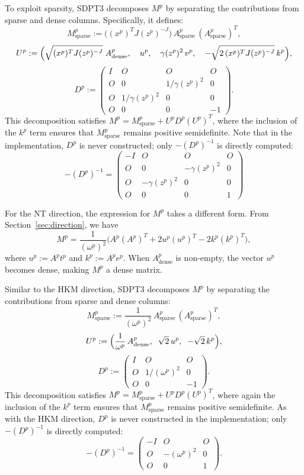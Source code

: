 To exploit sparsity, SDPT3 decomposes $M^p$ by separating the contributions 
from sparse and dense columns. Specifically, it defines:
\[
  M^p_{\mathrm{sparse}}
    := \bigl((x^p)^T J (z^p)^{-J}\bigr)\,
       A^p_{\mathrm{sparse}}\,(A^p_{\mathrm{sparse}})^T,
\]
\[
  U^p
    := \Bigl(
       \sqrt{(x^p)^T J (z^p)^{-J}}\;A^p_{\mathrm{dense}},
       \quad u^p,
       \quad \gamma(z^p)^2\,v^p,
       \quad -\sqrt{2\,(x^p)^T J (z^p)^{-J}}\,k^p
    \Bigr),
\]
\[
  D^p
    := \begin{pmatrix}
         I & O & O & O \\
         O & 0 & 1/\gamma(z^p)^2 & 0 \\
         O & 1/\gamma(z^p)^2 & 0 & 0 \\
         O & 0 & 0 & -1
       \end{pmatrix}.
\]
This decomposition satisfies $M^p = M^p_{\mathrm{sparse}} + U^p D^p (U^p)^T$, 
where the inclusion of the $k^p$ term ensures that $M^p_{\mathrm{sparse}}$ 
remains positive semidefinite. 
Note that in the implementation, $D^p$ is never constructed; 
only $-(D^p)^{-1}$ is directly computed:
\[
  -(D^p)^{-1}
  = \begin{pmatrix}
      -I & O & O & O \\
      O & 0 & -\gamma(z^p)^2 & 0 \\
      O & -\gamma(z^p)^2 & 0 & 0 \\
      O & 0 & 0 & 1
    \end{pmatrix}
\]

For the NT direction, the expression for $M^p$ takes a different form.
From Section~\ref{sec:direction}, we have
\[
  M^p
  = \frac{1}{(\omega^p)^2} \Big(
      A^p (A^p)^T + 2 u^p (u^p)^T - 2k^p (k^p)^T
  \Big),
\]
where $u^p := A^p t^p$ and $k^p := A^p e^p$.
When $A^p_{\mathrm{dense}}$ is non-empty, the vector $u^p$ becomes dense, making $M^p$ a dense matrix.

Similar to the HKM direction, SDPT3 decomposes $M^p$ by separating the contributions from sparse and dense columns:
\[
  M^p_{\mathrm{sparse}}
    := \frac{1}{(\omega^p)^2} \, A^p_{\mathrm{sparse}}\,(A^p_{\mathrm{sparse}})^T,
\]
\[
  U^p
    := \Bigl(
      \frac{1}{\omega^p}\,A^p_{\mathrm{dense}},
       \;\; \sqrt{2}\,u^p,
       \;\; -\sqrt{2}\,k^p
    \Bigr),
\]
\[
  D^p
    := \begin{pmatrix}
         I & O & O \\
         O & 1/(\omega^p)^2 & 0  \\
         O & 0 & -1 
       \end{pmatrix}.
\]
This decomposition satisfies $M^p = M^p_{\mathrm{sparse}} + U^p D^p (U^p)^T$,
where again the inclusion of the $k^p$ term ensures that $M^p_{\mathrm{sparse}}$ 
remains positive semidefinite.
As with the HKM direction, $D^p$ is never constructed in the implementation;
only $-(D^p)^{-1}$ is directly computed:
\[
  -(D^p)^{-1}
  = \begin{pmatrix}
      -I & O & O  \\
      O & -(\omega^p)^2 & 0  \\
      O & 0 & 1
    \end{pmatrix}.
\]


